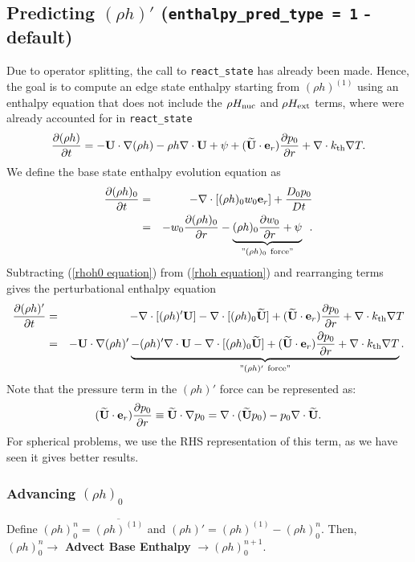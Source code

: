 \subsection{Predicting $(\rho h)'$ ({\tt enthalpy\_pred\_type = 1} - default)}
Due to operator splitting, the call to {\tt react\_state} has already
been made.  Hence, the goal is to compute an edge state enthalpy
starting from $(\rho h)^{(1)}$ using an enthalpy equation that does
not include the $\rho H_{\rm nuc}$ and $\rho H_{\rm ext}$ terms, where
were already accounted for in {\tt react\_state}
\begin{equation}
\frac{\partial(\rho h)}{\partial t} = -{\bf U}\cdot\nabla(\rho h) - \rho h\nabla\cdot{\bf U} 
+ \psi + (\widetilde{{\bf U}} \cdot \mathbf{e}_r) \frac{\partial p_0}{\partial r} + \nabla\cdot k_{\rm th}\nabla T. \label{rhoh equation}
\end{equation}
We define the base state enthalpy evolution equation as
\begin{eqnarray}
\frac{\partial(\rho h)_0}{\partial t} &=& -\nabla\cdot[(\rho h)_0 w_0{\bf e}_r] 
+ \frac{D_0p_0}{Dt} \nonumber \\
&=& -w_0\frac{\partial(\rho h)_0}{\partial r} 
- \underbrace{(\rho h)_0\frac{\partial w_0}{\partial r}+ \psi}_{"(\rho h)_0 ~ \text{force}"}
\enskip .\label{rhoh0 equation}
\end{eqnarray}
Subtracting (\ref{rhoh0 equation}) from (\ref{rhoh equation}) and rearranging terms gives 
the perturbational enthalpy equation
\begin{eqnarray}
\frac{\partial(\rho h)'}{\partial t} &=& -\nabla\cdot[(\rho h)'{\bf U}] 
- \nabla\cdot[(\rho h)_0\widetilde{{\bf U}}] + (\widetilde{{\bf U}} \cdot \mathbf{e}_r)\frac{\partial p_0}{\partial r} 
+ \nabla\cdot k_{\rm th}\nabla T\nonumber \\
&=& -{\bf U}\cdot\nabla(\rho h)' \underbrace{- (\rho h)'\nabla\cdot{\bf U} 
- \nabla\cdot[(\rho h)_0\widetilde{{\bf U}}] + (\widetilde{{\bf U}} \cdot \mathbf{e}_r)\frac{\partial p_0}{\partial r}
+ \nabla\cdot k_{\rm th}\nabla T}_{"(\rho h)' ~ \text{force}"}. \label{rhohprime equation}
\end{eqnarray}
Note that the pressure term in the $(\rho h)'$ force can be represented as:
\begin{equation}
(\widetilde{{\bf U}} \cdot \mathbf{e}_r)\frac{\partial p_0}{\partial r} \equiv \widetilde{{\bf U}}\cdot\nabla p_0 = 
\nabla\cdot(\widetilde{{\bf U}} p_0) - p_0\nabla\cdot\widetilde{{\bf U}}.
\end{equation}
For spherical problems, we use the RHS representation of this term, as we have
seen it gives better results.

\subsubsection{Advancing $(\rho h)_0$}
Define $(\rho h)_0^{n} = \overline{(\rho h)^{(1)}}$  
and $(\rho h)' = (\rho h)^{(1)}-(\rho h)_0^{n}$.  Then, $(\rho h)_0^{n} \rightarrow$ 
{\bf Advect Base Enthalpy} $\rightarrow (\rho h)_0^{n+1}$.

